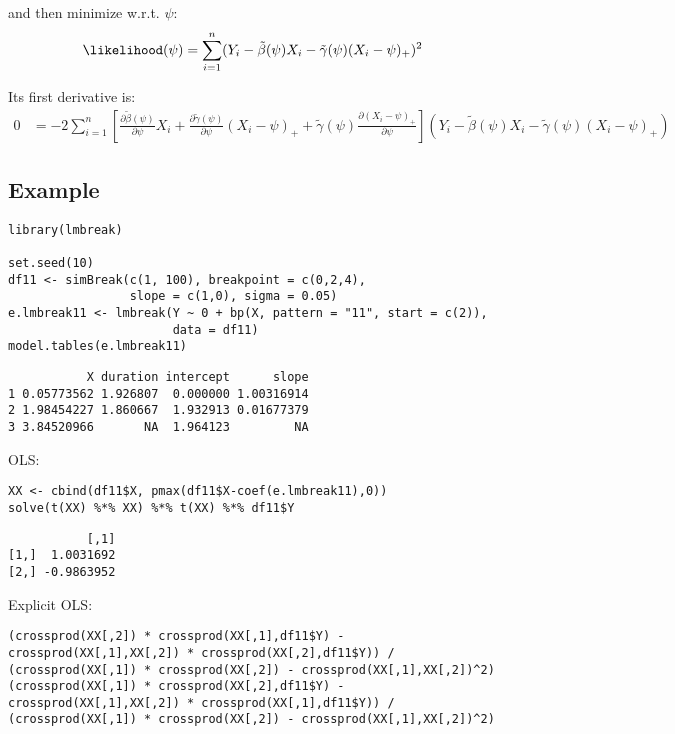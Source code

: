 \documentclass[12pt]{article}
\begin{document}
and then minimize w.r.t. \(\psi\):
\begin{align*}
\likelihood(\psi) &= \sum_{i=1}^n (Y_i - \tilde{\beta}(\psi) X_i - \tilde{\gamma}(\psi) (X_i - \psi)_+)^2
\end{align*}

Its first derivative is:
\begin{align*}
0 &= -2 \sum_{i=1}^n \left[
  \frac{\partial \tilde{\beta}(\psi)}{\partial \psi} X_i
+ \frac{\partial \tilde{\gamma}(\psi)}{\partial \psi}(X_i - \psi)_+
+ \tilde{\gamma}(\psi)\frac{\partial (X_i - \psi)_+}{\partial \psi}\right]
(Y_i - \tilde{\beta}(\psi) X_i - \tilde{\gamma}(\psi) (X_i - \psi)_+)
\end{align*}

\clearpage

\subsection{Example}
\label{sec:org5660144}

\lstset{language=r,label= ,caption= ,captionpos=b,numbers=none}
\begin{lstlisting}
library(lmbreak)

set.seed(10)
df11 <- simBreak(c(1, 100), breakpoint = c(0,2,4),
                 slope = c(1,0), sigma = 0.05)
e.lmbreak11 <- lmbreak(Y ~ 0 + bp(X, pattern = "11", start = c(2)),
                       data = df11)
model.tables(e.lmbreak11)
\end{lstlisting}

\begin{verbatim}
           X duration intercept      slope
1 0.05773562 1.926807  0.000000 1.00316914
2 1.98454227 1.860667  1.932913 0.01677379
3 3.84520966       NA  1.964123         NA
\end{verbatim}


OLS:
\lstset{language=r,label= ,caption= ,captionpos=b,numbers=none}
\begin{lstlisting}
XX <- cbind(df11$X, pmax(df11$X-coef(e.lmbreak11),0))
solve(t(XX) %*% XX) %*% t(XX) %*% df11$Y
\end{lstlisting}

\begin{verbatim}
           [,1]
[1,]  1.0031692
[2,] -0.9863952
\end{verbatim}


Explicit OLS:
\lstset{language=r,label= ,caption= ,captionpos=b,numbers=none}
\begin{lstlisting}
(crossprod(XX[,2]) * crossprod(XX[,1],df11$Y) - crossprod(XX[,1],XX[,2]) * crossprod(XX[,2],df11$Y)) / (crossprod(XX[,1]) * crossprod(XX[,2]) - crossprod(XX[,1],XX[,2])^2)
(crossprod(XX[,1]) * crossprod(XX[,2],df11$Y) - crossprod(XX[,1],XX[,2]) * crossprod(XX[,1],df11$Y)) / (crossprod(XX[,1]) * crossprod(XX[,2]) - crossprod(XX[,1],XX[,2])^2)
\end{lstlisting}
\end{document}

